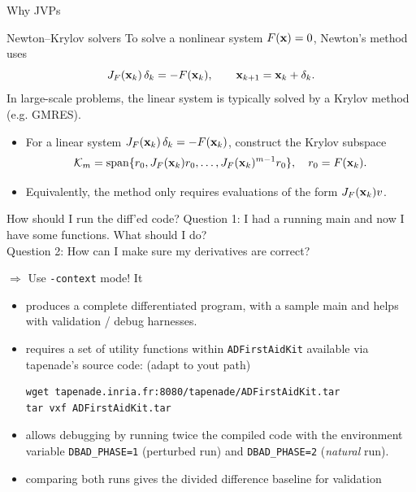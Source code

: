 \documentclass[12pt,xcolor={table}]{beamer}
\newcommand{\xbf}{{\bf x}}
\begin{document}
\begin{frame}{Why JVPs}
  \begin{block}{Newton--Krylov solvers}
    To solve a nonlinear system $F(\xbf)=0$, Newton's method uses
    $$
    J_F(\xbf_k)\,\delta_k = -F(\xbf_k), \qquad \xbf_{k+1} = \xbf_k + \delta_k.
    $$
    In large-scale problems, the linear system is typically solved by a Krylov method (e.g. GMRES).
  \end{block}

  \begin{itemize}
    \item For a linear system $J_F(\xbf_k)\,\delta_k = -F(\xbf_k)$, construct the Krylov subspace
      $$
      \mathcal{K}_m = \operatorname{span}\{r_0, J_F(\xbf_k)r_0, \ldots, J_F(\xbf_k)^{m-1}r_0\},
      \quad r_0 = F(\xbf_k).
      $$
    \item Equivalently, the method only requires evaluations of the form $J_F(\xbf_k)v$.
  \end{itemize}
\end{frame}

\begin{frame}[fragile]{How should I run the diff'ed code?}
  Question 1: I had a running main and now I have some functions. What should I do? \\
  Question 2: How can I make sure my derivatives are correct?

  $\Rightarrow$ Use \texttt{-context} mode! It
  \begin{itemize}
    \item produces a complete differentiated program, with a sample main and helps with validation / debug harnesses.
    \item requires a set of utility functions within \texttt{ADFirstAidKit} available via tapenade's source code: (adapt to yout path)
    \begin{lstlisting}
wget tapenade.inria.fr:8080/tapenade/ADFirstAidKit.tar
tar vxf ADFirstAidKit.tar
    \end{lstlisting}
    \item allows debugging by running twice the compiled code with the environment variable \texttt{DBAD\_PHASE=1} (perturbed run) and \texttt{DBAD\_PHASE=2} (\emph{natural} run).
    \item comparing both runs gives the divided difference baseline for validation
  \end{itemize}
 
\end{frame}
\end{document}
